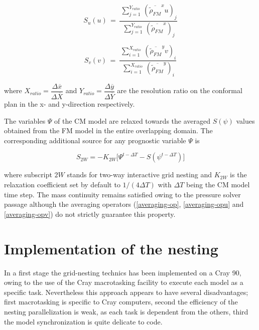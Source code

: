 \begin{equation}
\label{averaging-opu}
 S_u ( u) \, = \, \dfrac{ \,
\sum_{j=1}^{Y_{ratio}} \, \left( \overline{\tilde{\rho}_{FM}}^{x} u \right)_{j}}
{ \,
\sum_{j=1}^{Y_{ratio}} \, \left( \overline{\tilde{\rho}_{FM}}^{x}   \right)_{j}}
\end{equation}

\begin{equation}
\label{averaging-opv}
 S_v ( v) \, = \, \dfrac{ \,
\sum_{i=1}^{X_{ratio}} \, \left( \overline{\tilde{\rho}_{FM}}^{y} v \right)_{i}}
{ \,
\sum_{i=1}^{X_{ratio}} \, \left( \overline{\tilde{\rho}_{FM}}^{y}   \right)_{i}}
\end{equation}

\noindent
where $X_{ratio}=\dfrac{\Delta \overline{x}}{\Delta \overline{X}}$
  and $Y_{ratio}=\dfrac{\Delta \overline{y}}{\Delta \overline{Y}}$ are the
resolution ratio on the conformal plan in the x- and y-direction respectively.

 The variables $\Psi$ of the CM model are relaxed towards the averaged
$S( \psi)$ values obtained from the FM model in the entire overlapping domain.
The corresponding additional source for any prognostic variable $\Psi$ is


\begin{equation}
\label{2w_relaxation}
S_{2W} = -K_{2W} \big[ \Psi^{t-\Delta T} - S ( \psi^{t-\Delta T}) \big]
\end{equation}

\noindent
where subscript $2W$ stands for two-way interactive grid nesting and $K_{2W}$
is the relaxation coefficient set by default to $1/(4\Delta T)$ with $\Delta T$
being the CM model time step.
The mass continuity remains satisfied owing to the pressure solver passage
although the averaging operators
(\ref{averaging-op}, \ref{averaging-opu} and \ref{averaging-opv}) do not
strictly guarantee this property.


\section{Implementation of the nesting}

In a first stage the grid-nesting technics has been implemented on a Cray 90,
owing to the use of the Cray macrotasking facility to execute each model as a
specific task. Nevertheless this approach appears to have several disadvantages;
first  macrotasking is specific to Cray computers, second the efficiency of
the nesting parallelization is weak, as each task is dependent from the others,
third the model synchronization is quite delicate to code.

